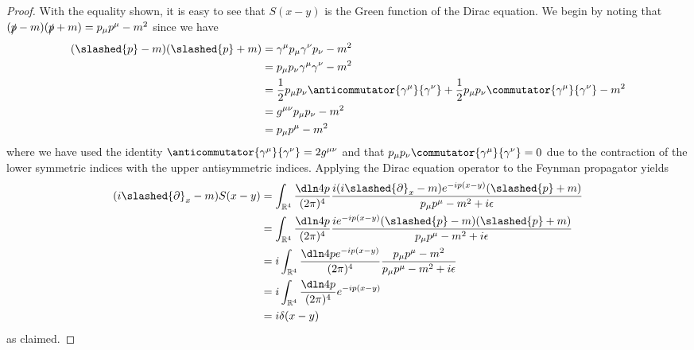 \begin{proof}
   With the equality shown, it is easy to see that \(S(x - y)\) is the Green function of the Dirac equation. We begin by noting that \((\slashed{p} - m)(\slashed{p} + m) = p_\mu p^\mu - m^2\) since we have
   \begin{align*}
      (\slashed{p} - m)(\slashed{p} + m) &= \gamma^\mu p_\mu \gamma^\nu p_\nu - m^2\\
                                         &= p_\mu p_\nu \gamma^\mu \gamma^\nu - m^2\\
                                         &= \frac12 p_\mu p_\nu \anticommutator{\gamma^\mu}{\gamma^\nu} + \frac12 p_\mu p_\nu \commutator{\gamma^\mu}{\gamma^\nu} - m^2\\
                                         &= g^{\mu\nu} p_\mu p_\nu - m^2\\
                                         &= p_\mu p^\mu - m^2
   \end{align*}
   where we have used the identity \(\anticommutator{\gamma^\mu}{\gamma^\nu} = 2 g^{\mu\nu}\) and that \(p_\mu p_\nu \commutator{\gamma^\mu}{\gamma^\nu} = 0\) due to the contraction of the lower symmetric indices with the upper antisymmetric indices. Applying the Dirac equation operator to the Feynman propagator yields
   \begin{align*}
      (i \slashed{\partial}_x - m)S(x - y) 
      &= \int_{\mathbb{R}^4} \frac{\dln4p}{(2\pi)^4} \frac{i(i\slashed{\partial}_x - m)e^{-ip(x - y)}(\slashed{p} + m)}{p_\mu p^\mu - m^2 + i \epsilon}\\
      &= \int_{\mathbb{R}^4} \frac{\dln4p}{(2\pi)^4} \frac{ie^{-ip(x - y)}(\slashed{p} - m)(\slashed{p} + m)}{p_\mu p^\mu - m^2 + i \epsilon}\\
      &= i \int_{\mathbb{R}^4} \frac{\dln4p e^{-ip(x - y)}}{(2\pi)^4} \frac{p_\mu p^\mu - m^2}{p_\mu p^\mu - m^2 + i \epsilon}\\
      &= i \int_{\mathbb{R}^4} \frac{\dln4p}{(2\pi)^4} e^{-ip(x - y)}\\
      &= i \delta(x - y)
   \end{align*}
   as claimed.
\end{proof}
